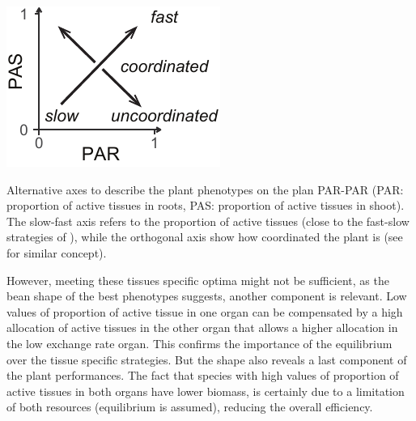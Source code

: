 \begin{marginfigure}\label{fig:function_div}
\includegraphics[width = \textwidth]{./2_PP/Figures/Landscape/ld_axis.pdf}
\caption{Alternative axes to describe the plant phenotypes on the plan PAR-PAR (PAR: proportion of active tissues in roots, PAS: proportion of active tissues in shoot). The slow-fast axis refers to the proportion of active tissues (close to the fast-slow strategies of \cite{reich_world-wide_2014}), while the orthogonal axis show how coordinated the plant is (see \cite{freschet_integrated_2015} for similar concept).}
\end{marginfigure}

However, meeting these tissues specific optima might not be sufficient, as the bean shape of the best phenotypes suggests, another component is relevant. Low values of proportion of active tissue in one organ can be compensated by a high allocation of active tissues in the other organ that allows a higher allocation in the low exchange rate organ. This confirms the importance of the equilibrium over the tissue specific strategies. But the shape also reveals a last component of the plant performances. The fact that species with high values of proportion of active tissues in both organs have lower biomass, is certainly due to a limitation of both resources (equilibrium is assumed), reducing the overall efficiency. 

